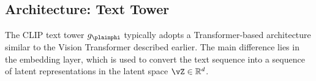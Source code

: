 \documentclass[../../book-main.tex]{subfiles}
\begin{document}

\subsection{Architecture: Text Tower}
The CLIP text tower \(g_{\plainphi}\) typically adopts a
Transformer-based architecture similar to the Vision Transformer
described earlier. The main difference lies in the embedding layer,
which is used to convert the text sequence into a sequence of latent
representations in the latent space \(\vZ \in \mathbb{R}^{d}\).
\end{document}
